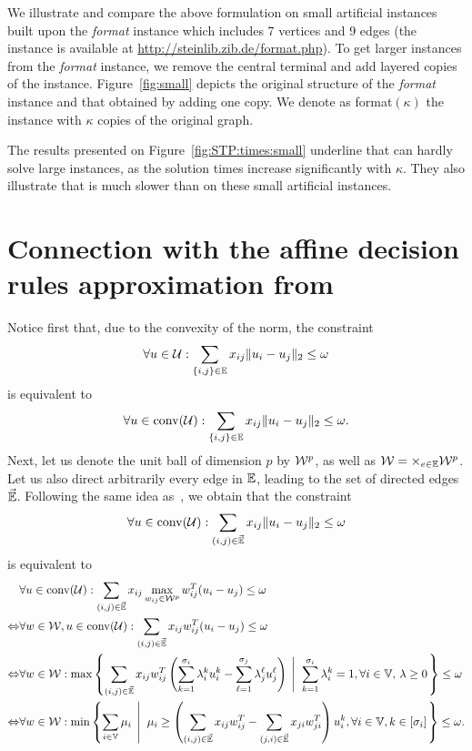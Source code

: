 \documentclass[12pt]{article}
\begin{document}
\begin{appendix}
We illustrate and compare the above formulation on small artificial instances built upon the \emph{format} instance which includes 7 vertices and 9 edges (the instance is available at \url{http://steinlib.zib.de/format.php}). To get larger instances from the \emph{format} instance, we remove the central terminal and add layered copies of the instance. 
Figure~\ref{fig:small} depicts the original structure of the \emph{format} instance and that obtained by adding one copy. We denote as format$(\kappa)$ the instance with $\kappa$ copies of the original graph. 



The results presented on Figure~\ref{fig:STP:times:small} underline that \compact{} can hardly solve large instances, as the solution times increase significantly with $\kappa$. They also illustrate that \cons{} is much slower than \exact{} on these small artificial instances.

\section{Connection with the affine decision rules approximation from~\cite{zhen2021robust}}
\label{app:adr}

Notice first that, due to the convexity of the norm, the constraint 
$$
\forall u\in\mathcal{U}:  \sum_{\{i,j\}\in \mathbb{E}} x_{ij} \|u_i-u_j\|_2 \leq \omega
$$
is equivalent to
$$
\forall u\in\operatorname*{conv}(\mathcal{U}):  \sum_{\{i,j\}\in \mathbb{E}} x_{ij} \|u_i-u_j\|_2 \leq \omega.
$$
Next, let us denote the unit ball of dimension $p$ by $\mathcal{W}^p$, as well as $\mathcal{W}=\times_{e\in \mathbb{E}}\mathcal{W}^p$. Let us also direct arbitrarily every edge in $\mathbb{E}$, leading to the set of directed edges $\Vec{\mathbb{E}}$. Following the same idea as~\cite[Theorem~1]{zhen2021robust}, we obtain that the constraint 
$$
\forall u\in\operatorname*{conv}(\mathcal{U}):  \sum_{(i,j)\in \Vec{\mathbb{E}}} x_{ij} \|u_i-u_j\|_2 \leq \omega
$$ 
is equivalent to
\begin{align}
&\forall u\in\operatorname*{conv}(\mathcal{U}): \sum_{(i,j)\in \Vec{\mathbb{E}}}x_{ij} \max_{w_{ij}\in \mathcal{W}^p}w_{ij}^T(u_i-u_j) \leq \omega \\
\Leftrightarrow &\forall {w}\in\mathcal{W}, u\in\operatorname*{conv}(\mathcal{U}): \sum_{(i,j)\in \Vec{\mathbb{E}}}x_{ij} w_{ij}^T(u_i-u_j) \leq \omega \\
\Leftrightarrow &\forall {w}\in\mathcal{W} : \max\left\{\sum_{(i,j)\in \Vec{\mathbb{E}}}x_{ij} w_{ij}^T\left(\sum_{k=1}^{\sigma_{i}}\lambda_i^ku_i^k-\sum_{\ell=1}^{\sigma_{j}}\lambda_j^\ell u_j^\ell\right) \; \left|\;\; \sum_{k=1}^{\sigma_{i}}\lambda_i^k=1, \forall i\in \mathbb{V},\, \lambda\geq0  \right.\right\} \leq \omega \\
\Leftrightarrow &\forall {w}\in\mathcal{W} : \min\left\{\sum_{i\in \mathbb{V}}\mu_i \; \left|\;\; \mu_i \geq \left(\sum_{(i,j)\in \Vec{\mathbb{E}}} x_{ij}w_{ij}^T-\sum_{(j,i)\in \Vec{\mathbb{E}}} x_{ji}w_{ji}^T\right)u_i^k, \forall i\in \mathbb{V},k\in[{\sigma_{i}}] \right.\right\} \leq \omega. \label{eq:dualization}
\end{align}


\end{appendix}
\end{document}
